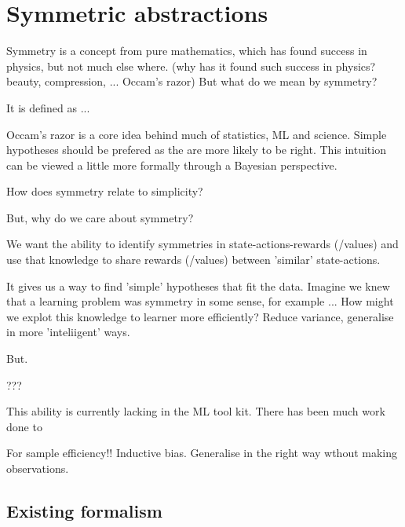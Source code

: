 \newpage
\section{Symmetric abstractions}



Symmetry is a concept from pure mathematics, which has found success in physics,
but not much else where. (why has it found such success in physics? beauty, compression, ... Occam's razor)
But what do we mean by symmetry?


It is defined as ...

Occam's razor is a core idea behind much of statistics, ML and science. Simple
hypotheses should be prefered as the are more likely to be right. This intuition
can be viewed a little more formally through a Bayesian perspective.

How does symmetry relate to simplicity?

But, why do we care about symmetry?
\begin{displayquote}
We want the ability to identify symmetries in state-actions-rewards (/values) and use that knowledge to share rewards (/values) between 'similar' state-actions.
\end{displayquote}
It gives us a way to find 'simple' hypotheses that fit the data.
Imagine we knew that a learning problem was symmetry in some sense, for example ...
How might we explot this knowledge to learner more efficiently?
Reduce variance, generalise in more 'inteliigent' ways.

But.

???

This ability is currently lacking in the ML tool kit. There has been much work done
to

For sample efficiency!! Inductive bias. Generalise in the right way wthout making observations.

\subsection{Existing formalism}

